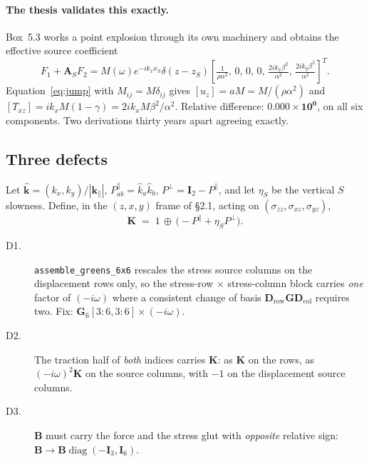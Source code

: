 \documentclass[11pt,a4paper]{article}
\newcommand{\bI}{\mathbf{I}}
\newcommand{\bB}{\mathbf{B}}
\newcommand{\bG}{\mathbf{G}}
\newcommand{\bD}{\mathbf{D}}
\newcommand{\bK}{\mathbf{K}}
\begin{document}
\paragraph{The thesis validates this exactly.}  Box~5.3 works a point explosion
through its own machinery and obtains the effective source coefficient
\begin{equation}\label{eq:box53}
  F_1 + \mathbf{A}_{S} F_2 = M(\omega)e^{-ik_x x_S}\delta(z-z_S)
  \left[\tfrac{1}{\rho\alpha^{2}},\,0,\,0,\,0,\,
  \tfrac{2ik_x\beta^{2}}{\alpha^{2}},\,
  \tfrac{2ik_y\beta^{2}}{\alpha^{2}}\right]^{T}.
\end{equation}
Equation~\eqref{eq:jump} with $M_{ij}=M\delta_{ij}$ gives
$[u_z] = aM = M/(\rho\alpha^2)$ and
$[T_{xz}] = ik_xM(1-\gamma) = 2ik_xM\beta^2/\alpha^2$.  Relative difference:
$\mathbf{0.000\times10^{0}}$, on all six components.  Two derivations thirty
years apart agreeing exactly.

\subsection{Three defects}

Let $\hat{\mathbf{k}} = (k_x,k_y)/|\mathbf{k}_\parallel|$,
$P^{\parallel}_{ab} = \hat{k}_a\hat{k}_b$,
$P^{\perp} = \bI_2 - P^{\parallel}$, and let $\eta_S$ be the vertical
$S$ slowness.  Define, in the $(z,x,y)$ frame of \S2.1, acting on
$(\sigma_{zz},\sigma_{xz},\sigma_{yz})$,
\begin{equation}\label{eq:K}
  \bK \;=\; 1 \,\oplus\, \bigl(-P^{\parallel} + \eta_S P^{\perp}\bigr).
\end{equation}

\begin{description}
\item[D1.] \texttt{assemble\_greens\_6x6} rescales the stress source columns on
  the displacement rows only, so the stress-row $\times$ stress-column block
  carries \emph{one} factor of $(-i\omega)$ where a consistent change of basis
  $\bD_{\text{row}}\bG\bD_{\text{col}}$ requires two.  Fix:
  $\bG_6[3\!:\!6,3\!:\!6] \times (-i\omega)$.
\item[D2.] The traction half of \emph{both} indices carries $\bK$: as $\bK$ on
  the rows, as $(-i\omega)^2\bK$ on the source columns, with $-1$ on the
  displacement source columns.
\item[D3.] $\bB$ must carry the force and the stress glut with \emph{opposite}
  relative sign: $\bB \to \bB\operatorname{diag}(-\bI_3,\bI_6)$.
\end{description}
\end{document}
